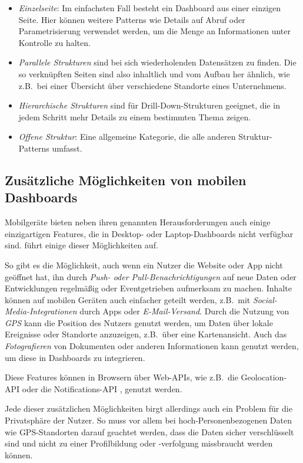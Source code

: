 \begin{itemize}
    \item \emph{Einzelseite}: Im einfachsten Fall besteht ein Dashboard aus einer einzigen Seite.
    Hier können weitere Patterns wie Details auf Abruf oder Parametrisierung verwendet werden, um die Menge an Informationen unter Kontrolle zu halten.
    \item \emph{Parallele Strukturen} sind bei sich wiederholenden Datensätzen zu finden.
    Die so verknüpften Seiten sind also inhaltlich und vom Aufbau her ähnlich, wie z.B.\ bei einer Übersicht über verschiedene Standorte eines Unternehmens.
    \item \emph{Hierarchische Strukturen} sind für Drill-Down-Strukturen geeignet, die in jedem Schritt mehr Details zu einem bestimmten Thema zeigen.
    \item \emph{Offene Struktur}: Eine allgemeine Kategorie, die alle anderen Struktur-Patterns umfasst.
\end{itemize}

\subsection{Zusätzliche Möglichkeiten von mobilen Dashboards}\label{subsec:additional-capabilities-of-mobile-dashboards}


Mobilgeräte bieten neben ihren genannten Herausforderungen auch einige einzigartigen Features, die in Desktop- oder Laptop-Dashboards nicht verfügbar sind.
\autocite[S. 609]{Watson.MobileBi.2015} führt einige dieser Möglichkeiten auf.

So gibt es die Möglichkeit, auch wenn ein Nutzer die Website oder App nicht geöffnet hat, ihn durch \emph{Push- oder Pull-Benachrichtigungen} auf neue Daten oder Entwicklungen regelmäßig oder Eventgetrieben aufmerksam zu machen.
Inhalte können auf mobilen Geräten auch einfacher geteilt werden, z.B.\ mit \emph{Social-Media-Integrationen} durch Apps oder \emph{E-Mail-Versand}.
Durch die Nutzung von \emph{GPS} \autocite{Steiner.GeolocationInTheBrowser.2019} kann die Position des Nutzers genutzt werden, um Daten über lokale Ereignisse oder Standorte anzuzeigen, z.B.\ über eine Kartenansicht.
Auch das \emph{Fotografieren} von Dokumenten oder anderen Informationen kann genutzt werden, um diese in Dashboards zu integrieren.

Diese Features können in Browsern über Web-APIs, wie z.B.\ die Geolocation-API \autocite{Steiner.GeolocationInTheBrowser.2019} oder die Notifications-API \autocite{MDN.UsingNotificationsAPI.2024}, genutzt werden.

Jede dieser zusätzlichen Möglichkeiten birgt allerdings auch ein Problem für die Privatsphäre der Nutzer.
So muss vor allem bei hoch-Personenbezogenen Daten wie GPS-Standorten \autocite[S. 4--7]{Wang.PreservingPrivacyForLocationBased.2010} darauf geachtet werden, dass die Daten sicher verschlüsselt sind und nicht zu einer Profilbildung oder -verfolgung missbraucht werden können.


